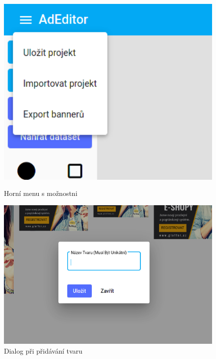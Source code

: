 \documentclass[czech,bachelor]{diploma}
\begin{document}
\begin{figure}[ht]
    \centering
    \begin{minipage}{.45\linewidth}
        \centering
        \includegraphics[width=1\textwidth]{Figures/editor/horni-menu.png}
        \caption{Horní menu s možnostni}
        \label{fig:editor:menu}
    \end{minipage}
    \begin{minipage}{.45\linewidth}
        \centering
        \includegraphics[width=1\textwidth]{Figures/editor/pridani-tvaru.png}
        \caption{Dialog při přidávání tvaru}
        \label{fig:editor:shape-dialog}
    \end{minipage}
\end{figure}
\end{document}
